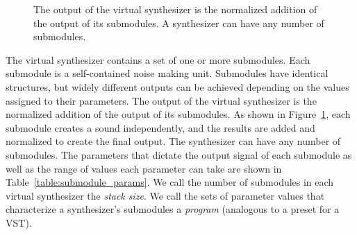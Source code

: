 \documentclass[\main/thesis.tex]{subfiles}
\begin{document}
 \begin{figure}[htbp]
    \begin{center}
    \end{center}
    \caption{The output of the virtual synthesizer is the normalized addition of the output of its submodules. A synthesizer can have any number of submodules. 
    }
\label{fig:synth_modules}
\end{figure}
 The virtual synthesizer contains a set of one or more submodules. Each submodule is a self-contained noise making unit. Submodules have identical structures, but widely different outputs can be achieved depending on the values assigned to their parameters. The output of the virtual synthesizer is the normalized addition of the output of its submodules. As shown in Figure~\ref{fig:synth_modules}, each submodule creates a sound independently, and the results are added and normalized to create the final output. The synthesizer can have any number of submodules. The parameters that dictate the output signal of each submodule as well as the range of values each parameter can take are shown in Table~\ref{table:submodule_params}. We call the number of submodules in each virtual synthesizer the \textit{stack size}. We call the sets of parameter values that characterize a synthesizer's submodules a \textit{program} (analogous to a preset for a VST).  
\end{document}
